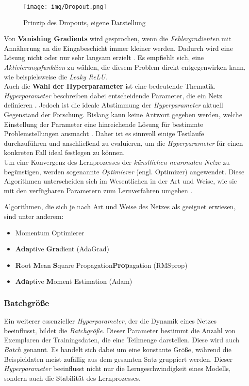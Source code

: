 \begin{figure}[H]
	\centering
	\texttt{[image: img/Dropout.png]}
	\caption{Prinzip des Dropouts, eigene Darstellung}
	\label{fig:Dropout}
\end{figure} 


Von \textbf{Vanishing Gradients} wird gesprochen, wenn die \textit{Fehlergradienten} mit Annäherung an die Eingabeschicht immer kleiner werden. Dadurch wird eine Lösung nicht oder nur sehr langsam erzielt \cite[vgl.][S. 210]{13}. Es empfiehlt sich, eine \textit{Aktivierungsfunktion} zu wählen, die diesem Problem direkt entgegenwirken kann, wie beispielsweise die \textit{Leaky ReLU}. \cite[vgl.][S. 212]{13} \\

Auch die \textbf{Wahl der Hyperparameter} ist eine bedeutende Thematik. \textit{Hyperparameter} beschreiben dabei entscheidende Parameter, die ein Netz definieren \cite[vgl.][S. 202]{13}.
Jedoch ist die ideale Abstimmung der \textit{Hyperparameter} aktuell Gegenstand der Forschung. Bislang kann keine Antwort gegeben werden, welche Einstellung der Parameter eine hinreichende Lösung für bestimmte Problemstellungen ausmacht \cite[vgl.][]{24}. Daher ist es sinnvoll einige Testläufe durchzuführen und anschließend zu evaluieren, um die \textit{Hyperparameter} für einen konkreten Fall ideal festlegen zu können. \\	

Um eine Konvergenz des Lernprozesses der \textit{künstlichen neuronalen Netze} zu begünstigen, werden sogenannte \textit{Optimierer} (engl. Optimizer) angewendet. \glqq Diese Algorithmen unterscheiden sich im Wesentlichen in der Art und Weise, wie sie mit den verfügbaren Parametern zum Lernverfahren umgehen\grqq {} \cite[S. 80]{12}.

Algorithmen, die sich je nach Art und Weise des Netzes als geeignet erwiesen, sind unter anderem:

\begin{itemize}
	\item Momentum Optimierer
	\item \textbf{Ada}ptive \textbf{Gra}dient (AdaGrad)
	\item \textbf{R}oot \textbf{M}ean \textbf{S}quare Propagation\textbf{Prop}agation (RMSprop) 
	\item \textbf{Ada}ptive \textbf{M}oment Estimation (Adam)
\end{itemize}
\cite[vgl.][S. 80]{12}


\subsubsection{Batchgröße}
Ein weiterer essenzieller \textit{Hyperparameter}, der die Dynamik eines Netzes beeinflusst, bildet die \textit{Batchgröße}. Dieser Parameter bestimmt die Anzahl von Exemplaren der Trainingsdaten, die eine Teilmenge darstellen. Diese wird auch \textit{Batch} genannt. Es handelt sich dabei um eine konstante Größe, während die Beispieldaten meist zufällig aus dem gesamten Satz gruppiert werden. Dieser \textit{Hyperparameter} beeinflusst nicht nur die Lerngeschwindigkeit eines Modells, sondern auch die Stabilität des Lernprozesses.

